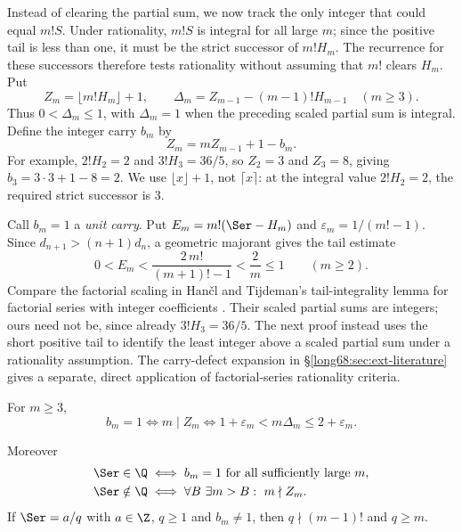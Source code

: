 Instead of clearing the partial sum, we now track the only integer
that could equal $m!S$. Under rationality, $m!S$ is integral for all
large $m$; since the positive tail is less than one, it must be the
strict successor of $m!H_m$. The recurrence for these successors
therefore tests rationality without assuming that $m!$ clears $H_m$. Put
\[
 Z_m=\lfloor m!H_m\rfloor+1,\qquad
 \Delta_m=Z_{m-1}-(m-1)!H_{m-1}\quad(m\ge3).
\]
Thus $0<\Delta_m\le1$, with $\Delta_m=1$ when the preceding
scaled partial sum is integral. Define the integer carry $b_m$ by
\begin{equation}\label{long68:eq:carry-recurrence}
 Z_m=mZ_{m-1}+1-b_m .
\end{equation}
For example, $2!H_2=2$ and $3!H_3=36/5$, so $Z_2=3$ and
$Z_3=8$, giving $b_3=3\cdot3+1-8=2$. We use
$\lfloor x\rfloor+1$, not $\lceil x\rceil$: at the integral value
$2!H_2=2$, the required strict successor is $3$.

Call $b_m=1$ a \emph{unit carry}.  Put
$E_m=m!(\Ser-H_m)$ and $\varepsilon_m=1/(m!-1)$.  Since
$d_{n+1}>(n+1)d_n$, a geometric majorant gives the tail estimate
\begin{equation}\label{long68:eq:tail-bound}
 0<E_m<\frac{2\,m!}{(m+1)!-1}<\frac2m\le1\qquad(m\ge2).
\end{equation}
Compare the factorial scaling in Han\v{c}l and Tijdeman's tail-integrality
lemma for factorial series with integer coefficients
\cite[Lemma~2.1 and the following remark,
p.~385]{hancl-tijdeman}. Their scaled partial sums are integers; ours
need not be, since already $3!H_3=36/5$. The next proof instead uses the
short positive tail to identify the least integer above a scaled partial sum
under a rationality assumption. The carry-defect expansion in
\S\ref{long68:sec:ext-literature} gives a separate, direct application of
factorial-series rationality criteria.

\label{long68:res:lead-carry-equivalence}
\label{long68:res:strict-successor-complete-characterization}
\begin{theorem}\label{long68:res:carry-equivalence}
For $m\ge3$,
\begin{equation}\label{long68:eq:unit-window}
 b_m=1
 \iff m\mid Z_m
 \iff 1+\varepsilon_m<m\Delta_m\le2+\varepsilon_m .
\end{equation}


Moreover
\begin{align}
 \Ser\in\Q
 &\iff b_m=1\ \hbox{for all sufficiently large }m,
 \label{long68:eq:carry-rationality}\\
 \Ser\notin\Q
 &\iff \forall B\ \exists m>B:\ m\nmid Z_m .
 \label{long68:eq:strict-misses}
\end{align}
If $\Ser=a/q$ with $a\in\Z$, $q\ge1$ and $b_m\ne1$, then $q\nmid(m-1)!$ and
$q\ge m$.
\end{theorem}

